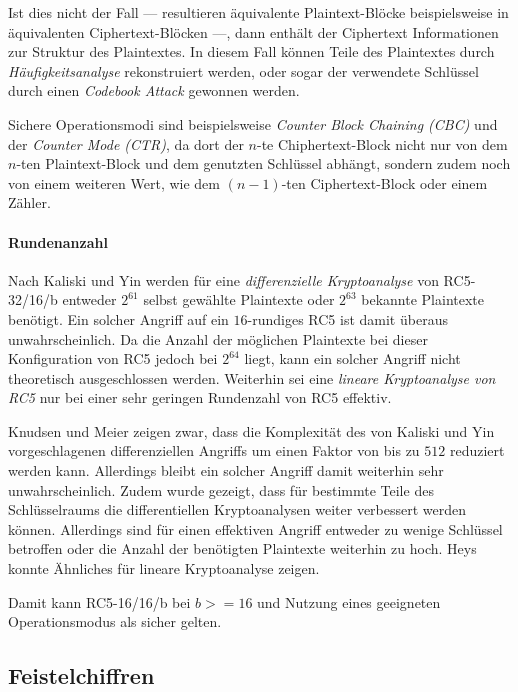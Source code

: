 \documentclass[course=erap]{aspdoc}
\begin{document}
Ist dies nicht der Fall --- resultieren äquivalente Plaintext-Blöcke beispielsweise in äquivalenten Ciphertext-Blöcken ---, dann enthält der Ciphertext Informationen zur Struktur des Plaintextes\cite[p.22]{bsi}. In diesem Fall können Teile des Plaintextes durch \textit{Häufigkeitsanalyse} rekonstruiert werden\cite[p.22]{bsi}, oder sogar der verwendete Schlüssel durch einen \textit{Codebook Attack} gewonnen werden\cite[p.2]{elbaz}.\bigbreak

Sichere Operationsmodi sind beispielsweise \textit{Counter Block Chaining (CBC)} und der \textit{Counter Mode (CTR)}, da dort der $n$-te Chiphertext-Block nicht nur von dem $n$-ten Plaintext-Block und dem genutzten Schlüssel abhängt, sondern zudem noch von einem weiteren Wert, wie dem $(n-1)$-ten Ciphertext-Block oder einem Zähler.\cite[p.22]{bsi}

\paragraph{Rundenanzahl} Nach Kaliski und Yin werden für eine \textit{differenzielle Kryptoanalyse} von RC5-32/16/b entweder $2^{61}$ selbst gewählte Plaintexte oder $2^{63}$ bekannte Plaintexte benötigt. Ein solcher Angriff auf ein $16$-rundiges RC5 ist damit überaus unwahrscheinlich. Da die Anzahl der möglichen Plaintexte bei dieser Konfiguration von RC5 jedoch bei $2^{64}$ liegt, kann ein solcher Angriff nicht theoretisch ausgeschlossen werden.\cite[p.6]{kaliski+yin} Weiterhin sei eine \textit{lineare Kryptoanalyse von RC5} nur bei einer sehr geringen Rundenzahl von RC5 effektiv.\cite[p.28]{kaliski+yin}\bigbreak

Knudsen und Meier zeigen zwar, dass die Komplexität des von Kaliski und Yin vorgeschlagenen differenziellen Angriffs um einen Faktor von bis zu $512$ reduziert werden kann.\cite[p.2]{knudsen+meier} Allerdings bleibt ein solcher Angriff damit weiterhin sehr unwahrscheinlich. Zudem wurde gezeigt, dass für bestimmte Teile des Schlüsselraums die differentiellen Kryptoanalysen weiter verbessert werden können.\cite[p.13]{knudsen+meier} Allerdings sind für einen effektiven Angriff entweder zu wenige Schlüssel betroffen oder die Anzahl der benötigten Plaintexte weiterhin zu hoch. Heys konnte Ähnliches für lineare Kryptoanalyse zeigen.\cite[p.5]{heys}\bigbreak

Damit kann RC5-16/16/b bei $b >= 16$ und Nutzung eines geeigneten Operationsmodus als sicher gelten.

\subsection{Feistelchiffren}
\end{document}

